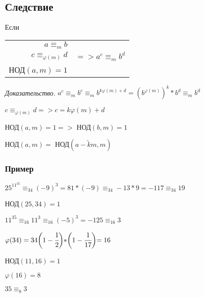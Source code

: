 \documentclass[12pt]{article}
\begin{document}
\subsection{Следствие}
Если
\begin{table}[h!]
    \begin{tabular}{r|c}
        $a\equiv_{m}b$ \\
        $c\equiv_{\varphi(m)}d$ & $=>a^{c}\equiv_{m}b^{d}$ \\
        НОД$(a,m)=1$
    \end{tabular}
\end{table}
\par \textit{Доказательство.} $a^{c}\equiv_{m}b^{c}\equiv_{m}b^{k\varphi(m)+d}=(b^{\varphi(m)})^{k}*b^{d}\equiv_{m}b^{d}$
\par $c\equiv_{\varphi(m)}d=>c=k\varphi(m)+d$
\par НОД$(a,m)=1=>$ НОД$(b,m)=1$
\par НОД$(a,m)=$ НОД$(a-\widetilde{k}m,m)$

\subsubsection{Пример}
$25^{11^{35}}\equiv_{34}(-9)^{3}=81*(-9)\equiv_{34}-13*9=-117\equiv_{34}19$
\par НОД$(25,34)=1$
\par $11^{35}\equiv_{16}11^{3}\equiv_{16}(-5)^{3}=-125\equiv_{16}3$
\par $\varphi(34)=34\biggl(1-\cfrac{1}{2}\biggl)*\biggl(1-\cfrac{1}{17}\biggl)=16$
\par НОД$(11,16)=1$
\par $\varphi(16)=8$
\par $35\equiv_{8}3$
\end{document}
